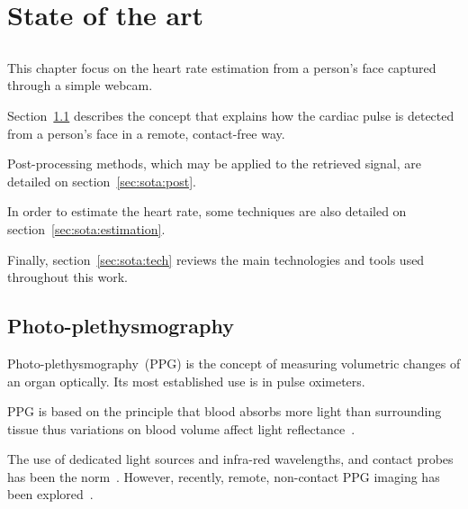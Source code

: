 \chapter{State of the art} \label{chap:sota}

\section*{}





This chapter focus on the heart rate estimation
from a person's face captured through a simple webcam.

Section~\ref{sec:sota:photo} describes the concept that explains how the
cardiac pulse is detected from a person's face in a remote, contact-free way.

Post-processing methods, which may be applied to the retrieved signal,
are detailed on section~\ref{sec:sota:post}.

In order to estimate the heart rate, some techniques are also detailed
on section~\ref{sec:sota:estimation}.

Finally, section~\ref{sec:sota:tech} reviews the main
technologies and tools used throughout this work.

\section{Photo-plethysmography} \label{sec:sota:photo}

Photo-plethysmography~(PPG) is the concept of measuring volumetric changes
of an organ optically. Its most established use is in pulse oximeters.

PPG is based on the principle that blood absorbs more light than surrounding
tissue thus variations on blood volume affect light
reflectance~\cite{Verkruysse2008Remote}.

The use of dedicated light sources and infra-red wavelengths, and contact probes
has been the norm~\cite{Ulyanov1993Pulse, Greneker1997Radar, Garbey2007Contact}.
However, recently, remote, non-contact PPG imaging has been
explored~\cite{Wieringa2005Contactless, Hu2008Feasibility}.

